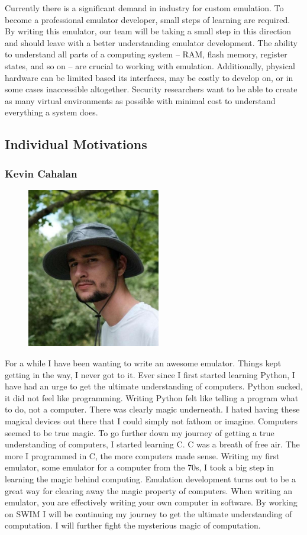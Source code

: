 \documentclass[
    paper=letter,
    parskip=half,
    fontsize=12pt,
    titlepage=firstiscover,
    toc=bibliography,
    numbers=endperiod
]{scrartcl}
\begin{document}
Currently there is a significant demand in industry for custom
emulation. To become a professional emulator developer, small steps of
learning are required. By writing this emulator, our team will be taking
a small step in this direction and should leave with a better
understanding emulator development. The ability to understand all parts
of a computing system -- RAM, flash memory, register states, and so on
-- are crucial to working with emulation. Additionally, physical
hardware can be limited based its interfaces, may be costly to develop
on, or in some cases inaccessible altogether. Security researchers want
to be able to create as many virtual environments as possible with
minimal cost to understand everything a system does.

\subsection{Individual Motivations}
\subsubsection{Kevin Cahalan}
\begin{figure}[H]
    \includegraphics[height=7cm]{profile-kevin}
\end{figure}

For a while I have been wanting to write an awesome emulator. Things kept getting in the way, I never got to it. Ever since I first started learning Python, I have had an urge to get the ultimate understanding of computers. Python sucked, it did not feel like programming. Writing Python felt like telling a program what to do, not a computer. There was clearly magic underneath. I hated having these magical devices out there that I could simply not fathom or imagine. Computers seemed to be true magic. To go further down my journey of getting a true understanding of computers, I started learning C. C was a breath of free air. The more I programmed in C, the more computers made sense. Writing my first emulator, some emulator for a computer from the 70s, I took a big step in learning the magic behind computing. Emulation development turns out to be a great way for clearing away the magic property of computers. When writing an emulator, you are effectively writing your own computer in software. By working on SWIM I will be continuing my journey to get the ultimate understanding of computation. I will further fight the mysterious magic of computation.
\end{document}
